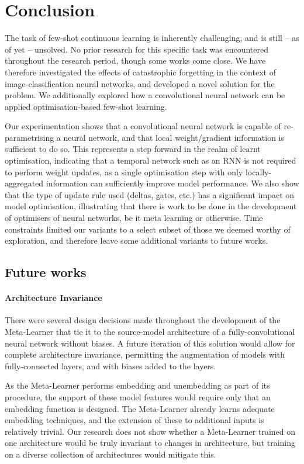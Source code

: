 \documentclass{report}
\begin{document}
\chapter{Conclusion}
The task of few-shot continuous learning is inherently challenging, and is still -- as of yet -- unsolved. No prior research for this specific task was encountered throughout the research period, though some works come close. We have therefore investigated the effects of catastrophic forgetting in the context of image-classification neural networks, and developed a novel solution for the problem. We additionally explored how a convolutional neural network can be applied optimisation-based few-shot learning. \par
Our experimentation shows that a convolutional neural network is capable of re-parametrising a neural network, and that local weight/gradient information is sufficient to do so. This represents a step forward in the realm of learnt optimisation, indicating that a temporal network such as an RNN is not required to perform weight updates, as a single optimisation step with only locally-aggregated information can sufficiently improve model performance. We also show that the type of update rule used (deltas, gates, etc.) has a significant impact on model optimisation, illustrating that there is work to be done in the development of optimisers of neural networks, be it meta learning or otherwise. Time constraints limited our variants to a select subset of those we deemed worthy of exploration, and therefore leave some additional variants to future works.

\section{Future works} \label{future-works}
\subsubsection{Architecture Invariance}
There were several design decisions made throughout the development of the Meta-Learner that tie it to the source-model architecture of a fully-convolutional neural network without biases. A future iteration of this solution would allow for complete architecture invariance, permitting the augmentation of models with fully-connected layers, and with biases added to the layers. \par
As the Meta-Learner performs embedding and unembedding as part of its procedure, the support of these model features would require only that an embedding function is designed. The Meta-Learner already learns adequate embedding techniques, and the extension of these to additional inputs is relatively trivial. Our research does not show whether a Meta-Learner trained on one architecture would be truly invariant to changes in architecture, but training on a diverse collection of architectures would mitigate this.
\end{document}
